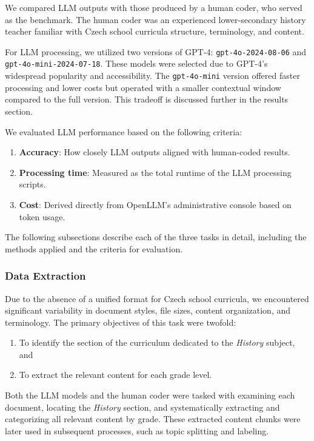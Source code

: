 \documentclass[]{interact}
\theoremstyle{plain}%
\theoremstyle{definition}
\theoremstyle{remark}
\begin{document}
We compared LLM outputs with those produced by a human coder, who served as the benchmark. The human coder was an experienced lower-secondary history teacher familiar with Czech school curricula structure, terminology, and content.

For LLM processing, we utilized two versions of GPT-4: \texttt{gpt-4o-2024-08-06} and \texttt{gpt-4o-mini-2024-07-18}. These models were selected due to GPT-4's widespread popularity and accessibility. The \texttt{gpt-4o-mini} version offered faster processing and lower costs but operated with a smaller contextual window compared to the full version. This tradeoff is discussed further in the results section.

We evaluated LLM performance based on the following criteria:  
\begin{enumerate}
    \item \textbf{Accuracy}: How closely LLM outputs aligned with human-coded results.  
    \item \textbf{Processing time}: Measured as the total runtime of the LLM processing scripts.  
    \item \textbf{Cost}: Derived directly from OpenLLM’s administrative console based on token usage.  
\end{enumerate}

The following subsections describe each of the three tasks in detail, including the methods applied and the criteria for evaluation.

\subsubsection{Data Extraction}

Due to the absence of a unified format for Czech school curricula, we encountered significant variability in document styles, file sizes, content organization, and terminology. The primary objectives of this task were twofold:  
\begin{enumerate}
    \item To identify the section of the curriculum dedicated to the \textit{History} subject, and  
    \item To extract the relevant content for each grade level.  
\end{enumerate}

Both the LLM models and the human coder were tasked with examining each document, locating the \textit{History} section, and systematically extracting and categorizing all relevant content by grade. These extracted content chunks were later used in subsequent processes, such as topic splitting and labeling.
\end{document}
